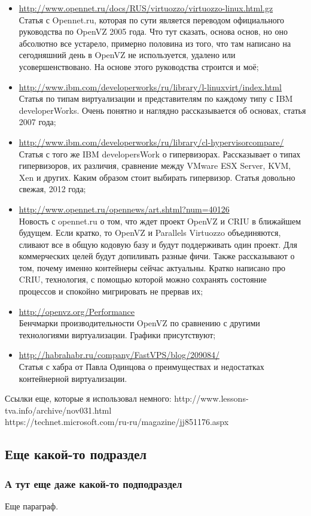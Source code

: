 \begin{itemize}
    \item \url{http://www.opennet.ru/docs/RUS/virtuozzo/virtuozzo-linux.html.gz} \\
    Статья с Opennet.ru, которая по сути является переводом официального руководства по OpenVZ 2005 года.
    Что тут сказать, основа основ, но оно абсолютно все устарело, примерно половина из того, что там написано на сегодняшний день в OpenVZ не используется, удалено или усовершенствовано.
    На основе этого руководства строится и моё;
    \item \url{http://www.ibm.com/developerworks/ru/library/l-linuxvirt/index.html} \\
    Статья по типам виртуализации и представителям по каждому типу с IBM developerWorks.
    Очень понятно и наглядно рассказывается об основах, статья 2007 года;
    \item \url{http://www.ibm.com/developerworks/ru/library/cl-hypervisorcompare/} \\
    Статья с того же IBM developersWork о гипервизорах.
    Рассказывает о типах гипервизоров, их различия, сравнение между VMware ESX Server, KVM, Xen и других.
    Каким образом стоит выбирать гипервизор.
    Статья довольно свежая, 2012 года;
    \item \url{http://www.opennet.ru/opennews/art.shtml?num=40126} \\
    Новость с opennet.ru о том, что ждет проект OpenVZ и CRIU в ближайшем будущем.
    Если кратко, то OpenVZ и Parallels Virtuozzo объединяются, сливают все в общую кодовую базу и будут поддерживать один проект.
    Для коммерческих целей будут допиливать разные фичи.
    Также рассказывают о том, почему именно контейнеры сейчас актуальны.
    Кратко написано про CRIU, технология, с помощью которой можно сохранять состояние процессов и спокойно мигрировать не прервав их;
    \item \url{http://openvz.org/Performance} \\
    Бенчмарки производительности OpenVZ по сравнению с другими технологиями виртуализации.
    Графики присутствуют;
    \item \url{http://habrahabr.ru/company/FastVPS/blog/209084/} \\
    Статья с хабра от Павла Одинцова о преимуществах и недостатках контейнерной виртуализации.
\end{itemize}

Ссылки еще, которые я использовал немного:
http://www.lessons-tva.info/archive/nov031.html \\
https://technet.microsoft.com/ru-ru/magazine/jj851176.aspx \\


\subsection{Еще какой-то подраздел}

\subsubsection{А тут еще даже какой-то подподраздел}

Еще параграф.
\fi

\clearpage
